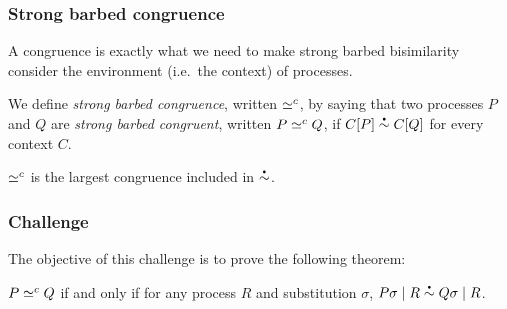 


\subsubsection{Strong barbed congruence}
A congruence is exactly what we need to make strong barbed bisimilarity consider the environment (i.e.\ the context) of processes.

We define \emph{strong barbed congruence}, written \( \simeq^c \), by saying that two processes \( P \) and \( Q \) are \emph{strong barbed congruent}, written \( P \simeq^c Q \), if \( \sbbisim{\applyctx{C}{P}}{\applyctx{C}{Q}} \) for every context \( C \).

\begin{lemma}
  \( \simeq^c \) is the largest congruence included in \( \sbbisim{}{} \).
\end{lemma}

\subsubsection{Challenge}
The objective of this challenge is to prove the following theorem:
\begin{theorem}
  \( P \simeq^c Q \) if and only if for any process \( R \) and substitution \( \sigma \), \( \sbbisim{\Ppar{\applysubst{\sigma}{P}}{R}}{\Ppar{\applysubst{\sigma}{Q}}{R}} \).
\end{theorem}




